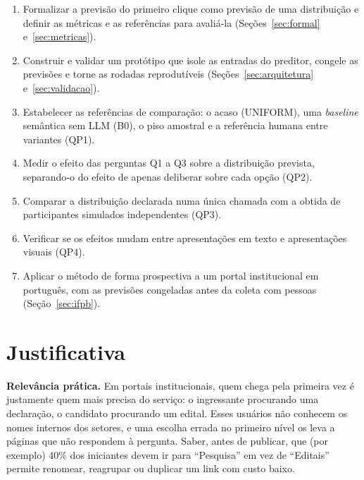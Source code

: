 \documentclass[12pt,oneside,a4paper,chapter=TITLE,english,brazil]{abntex2}
\begin{document}
\begin{enumerate}
\item Formalizar a previsão do primeiro clique como previsão de uma distribuição e definir as métricas e as referências para avaliá-la (Seções~\ref{sec:formal} e~\ref{sec:metricas}).
\item Construir e validar um protótipo que isole as entradas do preditor, congele as previsões e torne as rodadas reprodutíveis (Seções~\ref{sec:arquitetura} e~\ref{sec:validacao}).
\item Estabelecer as referências de comparação: o acaso (UNIFORM), uma \textit{baseline} semântica sem LLM (B0), o piso amostral e a referência humana entre variantes (QP1).
\item Medir o efeito das perguntas Q1 a Q3 sobre a distribuição prevista, separando-o do efeito de apenas deliberar sobre cada opção (QP2).
\item Comparar a distribuição declarada numa única chamada com a obtida de participantes simulados independentes (QP3).
\item Verificar se os efeitos mudam entre apresentações em texto e apresentações visuais (QP4).
\item Aplicar o método de forma prospectiva a um portal institucional em português, com as previsões congeladas antes da coleta com pessoas (Seção~\ref{sec:ifpb}).
\end{enumerate}

\section{Justificativa}
\label{sec:justificativa}

\textbf{Relevância prática.} Em portais institucionais, quem chega pela primeira vez é justamente quem mais precisa do serviço: o ingressante procurando uma declaração, o candidato procurando um edital. Esses usuários não conhecem os nomes internos dos setores, e uma escolha errada no primeiro nível os leva a páginas que não respondem à pergunta. Saber, antes de publicar, que (por exemplo) 40\% dos iniciantes devem ir para ``Pesquisa'' em vez de ``Editais'' permite renomear, reagrupar ou duplicar um link com custo baixo.
\end{document}
